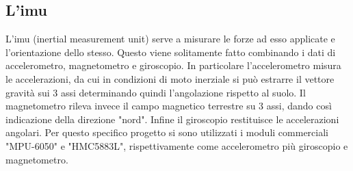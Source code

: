 \documentclass[10pt,a4paper]{article}
\begin{document}
\subsection{L'imu}

L'imu (inertial measurement unit) serve a misurare le forze ad esso applicate e l'orientazione dello stesso. Questo viene solitamente fatto combinando i dati di accelerometro, magnetometro e giroscopio. In particolare l'accelerometro misura le accelerazioni, da cui in condizioni di moto inerziale si pu\`o estrarre il vettore gravit\`a sui 3 assi determinando quindi l'angolazione rispetto al suolo. Il magnetometro rileva invece il campo magnetico terrestre su 3 assi, dando cos\`i indicazione della direzione "nord". Infine il giroscopio restituisce le accelerazioni angolari.
Per questo specifico progetto si sono utilizzati i moduli commerciali "MPU-6050" e "HMC5883L", rispettivamente come accelerometro pi\`u giroscopio e magnetometro. 
\end{document}
